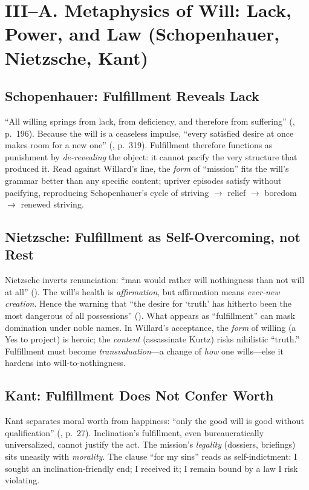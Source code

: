 \section*{III–A. Metaphysics of Will: Lack, Power, and Law (Schopenhauer, Nietzsche, Kant)}
\label{sec:iii-a-metaphysics-of-will-lack-power-and-law-schopenhauer-nietzsche-kant}

\subsection*{Schopenhauer: Fulfillment Reveals Lack}
\label{ssec:schopenhauer-fulfillment-reveals-lack}
“All willing springs from lack, from deficiency, and therefore from suffering” (\parencite{SchopenhauerWWR1969}, p.~196). Because the will is a ceaseless impulse, “every satisfied desire at once makes room for a new one” (\parencite{SchopenhauerWWR1969}, p.~319). Fulfillment therefore functions as punishment by \emph{de-revealing} the object: it cannot pacify the very structure that produced it. Read against Willard’s line, the \emph{form} of “mission” fits the will’s grammar better than any specific content; upriver episodes satisfy without pacifying, reproducing Schopenhauer’s cycle of striving $\rightarrow$ relief $\rightarrow$ boredom $\rightarrow$ renewed striving.

\subsection*{Nietzsche: Fulfillment as Self-Overcoming, not Rest}
\label{ssec:nietzsche-fulfillment-as-self-overcoming-not-rest}
Nietzsche inverts renunciation: “man would rather will nothingness than not will at all” (\parencite[III.28, p.~162]{NietzscheGenealogy1994}). The will’s health is \emph{affirmation}, but affirmation means \emph{ever-new creation}. Hence the warning that “the desire for ‘truth’ has hitherto been the most dangerous of all possessions” (\parencite[\S 34]{NietzscheBGE1990}). What appears as “fulfillment” can mask domination under noble names. In Willard’s acceptance, the \emph{form} of willing (a Yes to project) is heroic; the \emph{content} (assassinate Kurtz) risks nihilistic “truth.” Fulfillment must become \emph{transvaluation}—a change of \emph{how} one wills—else it hardens into will-to-nothingness.

\subsection*{Kant: Fulfillment Does Not Confer Worth}
\label{ssec:kant-fulfillment-does-not-confer-worth}
Kant separates moral worth from happiness: “only the good will is good without qualification” (\parencite{KantCPrR1996}, p.~27). Inclination’s fulfillment, even bureaucratically universalized, cannot justify the act. The mission’s \emph{legality} (dossiers, briefings) sits uneasily with \emph{morality}. The clause “for my sins” reads as self-indictment: I sought an inclination-friendly end; I received it; I remain bound by a law I risk violating.

